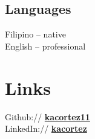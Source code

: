 \documentclass[top=0in]{deedy-resume-openfont}
\begin{document}
\begin{minipage}[t]{0.33\textwidth}
\subsection{Languages}
Filipino -- native
\\English -- professional
\sectionsep


\section{Links} 
Github:// \href{https://github.com/kacortez11}{\bf kacortez11} \\
LinkedIn://  \href{https://www.linkedin.com/in/kacortez}{\bf kacortez} \\




%
%

\end{minipage}
\end{document}
